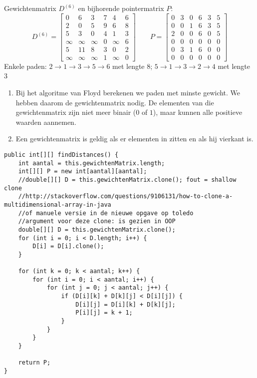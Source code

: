 \begin{Oplossing}{8.1}
Gewichtenmatrix $D^{(6)}$ en bijhorende pointermatrix $P$:
\begin{equation*}
D^{(6)}=\begin{bmatrix}
0 & 6 & 3 & 7 & 4 & 6\\
2 & 0 & 5 & 9 & 6 & 8\\
5 & 3 & 0 & 4 & 1 & 3\\
\infty & \infty & \infty & 0 & \infty & 6 \\
5 & 11 & 8 & 3 & 0 & 2\\
\infty & \infty & \infty & 1 & \infty & 0
\end{bmatrix}
\qquad
P=\begin{bmatrix}
0 & 3 & 0 & 6 & 3 & 5 \\
0 & 0 & 1 & 6 & 3 & 5\\
2 &0 &0 & 6 & 0 & 5\\
0 & 0 & 0 & 0 & 0 & 0 \\
0 &  3 & 1 & 6 & 0 & 0 \\
0 & 0 & 0 & 0 & 0 & 0
\end{bmatrix}
\end{equation*}
Enkele paden: $2\rightarrow1\rightarrow3\rightarrow5\rightarrow6$ met lengte 8; $5 \rightarrow 1 \rightarrow 3 \rightarrow  2\rightarrow 4$ met lengte 3
\end{Oplossing}
\begin{Oplossing}{8.2}
\begin{enumerate}
\item Bij het algoritme van Floyd berekenen we  paden met minste gewicht. We hebben daarom de gewichtenmatrix nodig. De elementen van die gewichtenmatrix zijn niet meer binair ($0$ of $1$), maar kunnen alle positieve waarden aannemen.
\item Een gewichtenmatrix is geldig als er elementen in zitten en als hij vierkant is.
\end{enumerate}

\end{Oplossing}
\begin{Oplossing}{8.3}
\begin{lstlisting}[caption={findDistances}, label=FloydfindDistances]
public int[][] findDistances() {
	int aantal = this.gewichtenMatrix.length;
	int[][] P = new int[aantal][aantal];
	//double[][] D = this.gewichtenMatrix.clone(); fout = shallow clone
	//http://stackoverflow.com/questions/9106131/how-to-clone-a-multidimensional-array-in-java
	//of manuele versie in de nieuwe opgave op toledo
	//argument voor deze clone: is gezien in OOP
	double[][] D = this.gewichtenMatrix.clone();
	for (int i = 0; i < D.length; i++) {
	    D[i] = D[i].clone();
	}

	for (int k = 0; k < aantal; k++) {
		for (int i = 0; i < aantal; i++) {
			for (int j = 0; j < aantal; j++) {
				if (D[i][k] + D[k][j] < D[i][j]) {
					D[i][j] = D[i][k] + D[k][j];
					P[i][j] = k + 1;
				}
			}
		}
	}

	return P;
}
\end{lstlisting}
\end{Oplossing}
